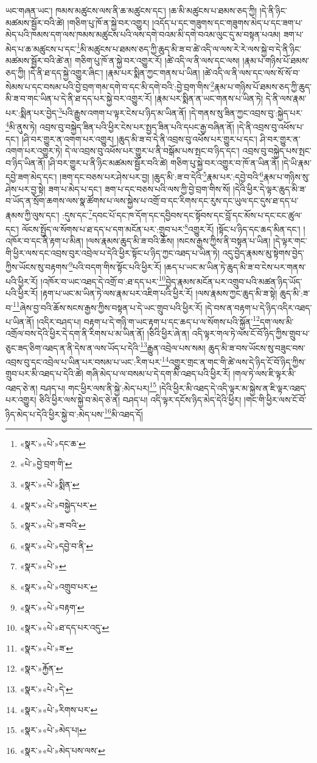 ཡང་གཞན་ཡང་། ཁམས་མཚུངས་ལས་ནི་ཆ་མཚུངས་དང་། །ཆ་མི་མཚུངས་པ་ཐམས་ཅད་ཀྱི། །དེ་ནི་ཉིང་མཚམས་སྦྱོར་བའི་ཚེ། །གཅིག་པུ་ཁོ་ན་སྐྱེ་བར་འགྱུར། །འདོད་པ་དང་གཟུགས་དང་གཟུགས་མེད་པ་དང་ཟག་པ་མེད་པའི་ཁམས་དག་ལས་ཁམས་མཚུངས་པའི་ལས་དགེ་བའམ་མི་དགེ་བའམ་ལུང་དུ་མ་བསྟན་པའམ། ཟག་པ་མེད་པ་ཆ་མཚུངས་པ་དང་\footnote{«སྣར་»«པེ་»དང་ཆ་}མི་མཚུངས་པ་ཐམས་ཅད་ཀྱི་ཆུད་མི་ཟ་བ་ཚེ་འདི་ལ་ལས་རེ་རེ་ལས་སྐྱེ་བ་དེ་ནི་ཉིང་མཚམས་སྦྱོར་བའི་ཚེ་ན། གཅིག་པུ་ཁོ་ན་སྐྱེ་བར་འགྱུར་རོ། །ཚེ་འདི་ལ་ནི་ལས་དང་ལས། །རྣམ་པ་གཉིས་པོ་ཐམས་ཅད་ཀྱི། །དེ་ནི་ཐ་དད་སྐྱེ་འགྱུར་ཞིང་། །རྣམ་པར་སྨིན་ཀྱང་གནས་པ་ཡིན། །ཚེ་འདི་ལ་ནི་ལས་དང་ལས་སོ་སོ་བ་སེམས་པ་དང་བསམ་པའི་བྱེ་བྲག་གམ་དགེ་བ་དང་མི་དགེ་བའི་:བྱེ་བྲག་གིས་\footnote{«པེ་»བྱེ་བྲག་གི་}རྣམ་པ་གཉིས་པོ་ཐམས་ཅད་ཀྱི་ཆུད་མི་ཟ་བ་གང་ཡིན་པ་དེ་ནི་ཐ་དད་པར་སྐྱེ་བར་འགྱུར་རོ། །རྣམ་པར་སྨིན་ན་ཡང་གནས་པ་ཡིན་ཏེ། དེ་ནི་ལས་རྣམ་པར་:སྨིན་པར་བྱེད་\footnote{«སྣར་»«པེ་»སྨིན་}པའི་རྒྱུས་འགག་པ་ལྟར་ངེས་པ་ཉིད་མ་ཡིན་ནོ། །དེ་གནས་སུ་ཟིན་ཀྱང་འབྲས་བུ་:སྐྱེད་པར་\footnote{«སྣར་»«པེ་»བསྐྱེད་པར་}མི་ནུས་ཏེ། འབྲས་བུ་བསྐྱེད་ཟིན་པའི་ཕྱིར་ངེས་པར་སྤྱད་ཟིན་པའི་དཔང་རྒྱ་བཞིན་ནོ། །དེ་ནི་འབྲས་བུ་འཕོས་པ་དང་། །ཤི་བར་གྱུར་ན་འགག་པར་འགྱུར། །ཆུད་མི་ཟ་བ་དེ་ནི་འབྲས་བུ་འཕོས་པར་གྱུར་པ་དང་། ཤི་བར་གྱུར་ན་འགག་པར་འགྱུར་ཏེ། དེ་ལ་འབྲས་བུ་འཕོས་པར་གྱུར་པ་ནི་བསྒོམ་པས་སྤང་བ་ཉིད་དང་། འབྲས་བུ་བསྐྱེད་པས་སྤང་བ་ཉིད་ཡིན་ནོ། །ཤི་བར་གྱུར་པ་ནི་ཉིང་མཚམས་སྦྱོར་བའི་ཚེ། གཅིག་པུ་སྐྱེ་བར་འགྱུར་བ་ཁོ་ན་ཡིན་ནོ། །དེ་ཡི་རྣམ་དབྱེ་ཟག་མེད་དང་། །ཟག་དང་བཅས་པར་ཤེས་པར་བྱ། །ཆུད་མི་:ཟ་བ་དེའི་\footnote{«སྣར་»«པེ་»ཟ་བའི་}རྣམ་པར་:དབྱེ་བའི་\footnote{«སྣར་»«པེ་»དབྱེ་བ་ནི་}རྣམ་པ་གཉིས་སུ་ཤེས་པར་བྱ་སྟེ། ཟག་པ་མེད་པ་དང་། ཟག་པ་དང་བཅས་པའི་ལས་ཀྱི་བྱེ་བྲག་གིས་སོ། །དེའི་ཕྱིར་དེ་ལྟར་ཆུད་མི་ཟ་བ་ཡོད་ན་སྲོག་ཆགས་ལས་སྣ་ཚོགས་པ་ལས་སྐྱེས་པ་འགྲོ་བ་དང་རིགས་དང་རུས་དང་ཡུལ་དང་དུས་ཐ་དད་པ་རྣམས་ཀྱི་ལུས་དང་། :དུས་དང་\footnote{«སྣར་»«པེ་»}དབང་པོ་དང་ཁ་དོག་དང་དབྱིབས་དང་སྟོབས་དང་བློ་དང་མོས་པ་དང་ངང་ཚུལ་དང་། ལོངས་སྤྱོད་ལ་སོགས་པ་ཐ་དད་པ་དག་མངོན་པར་:གྲུབ་པར་\footnote{«སྣར་»«པེ་»འགྲུབ་པར་}འགྱུར་རོ། །སྟོང་པ་ཉིད་དང་ཆད་མིན་དང་། །འཁོར་བ་དང་ནི་རྟག་པ་མིན། །ལས་རྣམས་ཆུད་མི་ཟ་བའི་ཆོས། །སངས་རྒྱས་ཀྱིས་ནི་བསྟན་པ་ཡིན། །དེ་ལྟར་གང་གི་ཕྱིར་ལས་དང་འབྲས་བུར་འབྲེལ་པ་དེའི་ཕྱིར་སྟོང་པ་ཉིད་ཀྱང་འཐད་པ་ཡིན་ཏེ། འདུ་བྱེད་རྣམས་མུ་སྟེགས་བྱེད་ཀྱིས་ཡོངས་སུ་བརྟགས་\footnote{«སྣར་»«པེ་»བརྟག་}པའི་བདག་གིས་སྟོང་པའི་ཕྱིར་རོ། །ཆད་པ་ཡང་མ་ཡིན་ཏེ་ཆུད་མི་ཟ་བ་ངེས་པར་གནས་པའི་ཕྱིར་རོ། །འཁོར་བ་ཡང་འཐད་དེ་འགྲོ་བ་:ཐ་དད་པར་\footnote{«སྣར་»«པེ་»ཐ་དད་པར་འདུ་}བྱེད་རྣམས་མངོན་པར་འགྲུབ་པའི་མཚན་ཉིད་ཡོད་པའི་ཕྱིར་རོ། །རྟག་པ་ཡང་མ་ཡིན་ཏེ་ལས་རྣམ་པར་འཇིག་པའི་ཕྱིར་རོ། །ལས་རྣམས་ཀྱང་ཆུད་མི་ཟ་སྟེ། ཆུད་མི་:ཟ་བ་\footnote{«སྣར་»«པེ་»ཟ་}ཞེས་བྱ་བའི་ཆོས་སངས་རྒྱས་ཀྱིས་བསྟན་པ་དེ་ཡང་གྲུབ་པའི་ཕྱིར་རོ། །དེ་བས་ན་བརྟག་པ་དེ་ཉིད་འདིར་འཐད་པ་ཡིན་ནོ། །འདིར་བཤད་པ། བརྟག་པ་དེ་གཉི་ག་ཡང་རྟག་པ་དང་ཆད་པ་ལ་སོགས་པའི་སྐྱོན་\footnote{«སྣར་»རྐྱོན་}དག་ལས་མི་འགྲོལ་བས་དེའི་ཕྱིར་དེ་དག་ནི་རིགས་པ་མ་ཡིན་ནོ། །ཅིའི་ཕྱིར་ཞེ་ན། འདི་ལྟར་གལ་ཏེ་ལས་ངོ་བོ་ཉིད་ཀྱིས་གྲུབ་པ་ཅུང་ཟད་ཅིག་འཐད་ན་ནི་དེས་ན་ལས་ཡོད་པ་དེའི་\footnote{«སྣར་»«པེ་»དེ་}རྒྱུན་འབྲེལ་པས་སམ། ཆུད་མི་ཟ་བས་ཡོངས་སུ་བཟུང་བས་འབྲས་བུ་དང་འབྲེལ་པ་ཡིན་པར་བསམ་པ་ཡང་:རིག་པར་\footnote{«སྣར་»«པེ་»རིགས་པར་}འགྱུར་གྲང་ན་གང་གི་ཚེ་ལས་དེ་ཉིད་ངོ་བོ་ཉིད་ཀྱིས་གྲུབ་པར་མི་འཐད་པ་དེའི་ཚེ། གཞི་མེད་པ་ལ་བསམ་པ་དེ་དག་མི་འཐད་པའི་ཕྱིར་རོ། །གལ་ཏེ་ལས་ཇི་ལྟར་མི་འཐད་ཅེ་ན། བཤད་པ། གང་ཕྱིར་ལས་ནི་སྐྱེ་:མེད་པར།\footnote{«སྣར་»«པེ་»མེད་པ།} །དེའི་ཕྱིར་མི་འཐད་དེ་འདི་ལྟར་མ་སྐྱེས་ན་ཇི་ལྟར་འཐད་པར་འགྱུར། ཅིའི་ཕྱིར་ལས་སྐྱེ་བ་མེད་ཅེ་ན། བཤད་པ། འདི་ལྟར་དངོས་ཉིད་མེད་དེའི་ཕྱིར། །གང་གི་ཕྱིར་ལས་ངོ་བོ་ཉིད་མེད་པ་དེའི་ཕྱིར་སྐྱེ་བ་:མེད་པས་\footnote{«སྣར་»«པེ་»མེད་པས་ལས་}མི་འཐད་དོ། 